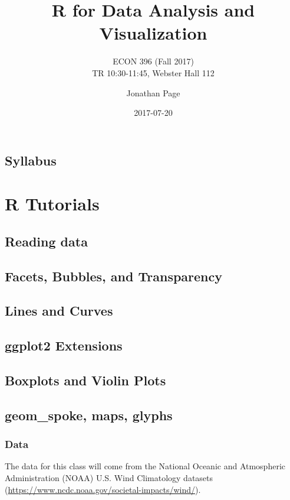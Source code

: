 \documentclass[]{book}
\title{R for Data Analysis and Visualization}
\subtitle{ECON 396 (Fall 2017)\\
TR 10:30-11:45, Webster Hall 112}
\author{Jonathan Page}
\date{2017-07-20}
\begin{document}
\maketitle

{
\setcounter{tocdepth}{1}
\tableofcontents
}
\chapter*{Syllabus}\label{syllabus}

\part{R Tutorials}\label{part-r-tutorials}

\chapter{Reading data}\label{read-data}

\chapter{Facets, Bubbles, and Transparency}\label{facets-and-bubbles}

\chapter{Lines and Curves}\label{lines-and-curves}

\chapter{ggplot2 Extensions}\label{ggplot-exts}

\chapter{Boxplots and Violin Plots}\label{boxplots-and-violins}

\chapter{geom\_spoke, maps, glyphs}\label{geom_spoke}

\section{Data}\label{data}

The data for this class will come from the National Oceanic and
Atmospheric Administration (NOAA) U.S. Wind Climatology datasets
(\url{https://www.ncdc.noaa.gov/societal-impacts/wind/}).
\end{document}
